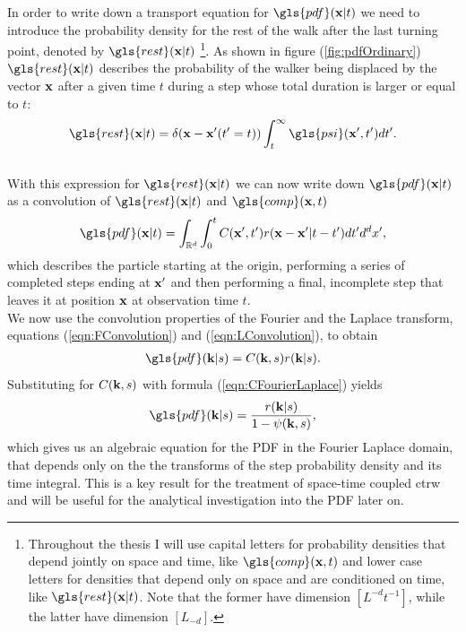 In order to write down a transport equation for $\gls{pdf}(\ve{x}|t)$ we need to introduce the probability density for the rest of the walk after the last turning point, denoted by $\gls{rest}(\ve{x}|t)$
\footnote{
Throughout the thesis I will use capital letters for probability densities that depend jointly on space and time, like $\gls{comp}(\ve{x},t)$ and lower case letters for densities that depend only on space and are conditioned on time, like $\gls{rest}(\ve{x}|t)$. Note that the former have dimension $[L^{-d} t^{-1}]$, while the latter have dimension $[L_{-d}]$.
}. 
As shown in figure (\ref{fig:pdfOrdinary}) $\gls{rest}(\ve{x}|t)$ describes the probability of the walker being displaced by the vector $\mathbf{ x }$ after a given time $t$ during a step whose total duration is larger or equal to $t$:\\
%
{ \color{blue}
\begin{align}
\gls{rest}(\ve{x}|t) = \delta(\ve{x} - \ve{x}'(t'=t)) \int_{t}^{\infty} \gls{psi}(\ve{x}',t') dt' .
\end{align}
}
%
\\

With this expression for $\gls{rest}(\ve{x}|t)$ we can now write down $\gls{pdf}(\ve{x}|t)$ as a convolution of $\gls{rest}(\ve{x}|t)$ and $\gls{comp}(\ve{x},t)$
%
\begin{align}
\gls{pdf}(\ve{x}|t) = \int_{\mathbb{R}^{d}} \int_0^t  C(\ve{x}',t') r(\ve{x}-\ve{x}'|t-t') d t' d^{d}x' ,
\end{align}
%
which describes the particle starting at the origin, performing a series of completed steps ending at $\mathbf{ x' }$ and then performing a final, incomplete step that leaves it at position $\mathbf{ x }$ at observation time $t$.\\
We now use the convolution properties of the Fourier and the Laplace transform, equations (\ref{eqn:FConvolution}) and (\ref{eqn:LConvolution}), to obtain 
%
\begin{align}
\gls{pdf}(\ve{k}|s) = C(\ve{k},s) r(\ve{k}|s) .
\end{align}
%
Substituting for $C(\mathbf{ k },s)$ with formula (\ref{eqn:CFourierLaplace}) yields
%
\begin{align}
\gls{pdf}(\ve{k}|s) = \frac{ r(\ve{k}|s)}{1 - \psi(\ve{k},s)} \label{eqn:pdfFourierLaplace} ,
\end{align}
%
which gives us an algebraic equation for the \gls{PDF} in the Fourier Laplace domain, that depends only on the the transforms of the step probability density and its time integral. This is a key result for the treatment of space-time coupled \gls{ctrw} {\color{blue} and will be useful for the analytical investigation into the \gls{PDF} later on.} \\

